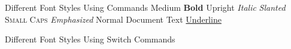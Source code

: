 \documentclass{article}
\begin{document}
Different Font Styles Using Commands
\newline \textmd{Medium}
\newline \textbf{Bold}       
\newline \textup{Upright}    
\newline \textit{Italic}     
\newline \textsl{Slanted}    
\newline \textsc{Small Caps}
\newline \emph{Emphasized}
\newline \textnormal{Normal Document Text}
\newline \underline{Underline}

Different Font Styles Using Switch Commands
\end{document}
